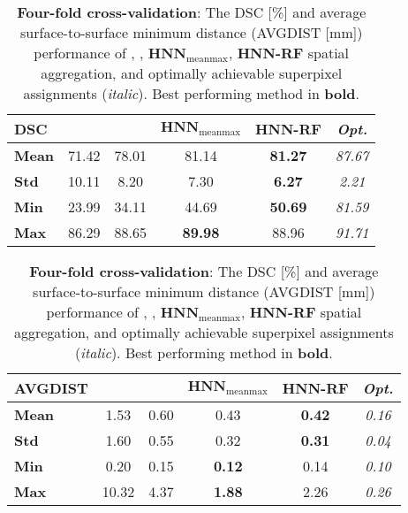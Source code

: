 \documentclass[journal]{IEEEtran}
\begin{document}
\begin{table}[htb]
\centering
 \caption{\small \textbf{Four-fold cross-validation}: The DSC [\%] and average surface-to-surface minimum distance (AVGDIST [mm]) performance of \cite{roth2015deeporgan}, \cite{roth2016spatial}, $\mathbf{HNN}_\mathrm{meanmax}$, \textbf{HNN-RF} spatial aggregation, and optimally achievable superpixel assignments (\textit{italic}). Best performing method in \textbf{bold}.} 
 \begin{subtable}[center]{0.95\columnwidth}
  \raggedright
    \begin{tabular}{l|c|c|c|c|c}
    \toprule
		\toprule
    \textbf{DSC} & \cite{roth2015deeporgan}  & \cite{roth2016spatial}& $\mathbf{HNN}_\mathrm{meanmax}$ & \textbf{HNN-RF} & \textit{\textbf{Opt.}} \\
		\midrule    
\textbf{Mean}	&71.42 & 78.01& 81.14                 &\textbf{81.27}  	& \textit{87.67}   \\
\textbf{Std}      &10.11 & 8.20  	      & 7.30                   &\textbf{6.27} & \textit{ 2.21}  \\
\textbf{Min}	&23.99 & 34.11 	   &	44.69                  &\textbf{50.69} & \textit{81.59}\\
\textbf{Max}	&86.29 & 88.65  	   &	\textbf{89.98} &88.96 & \textit{ 91.71} \\
    \bottomrule
		\bottomrule
    \end{tabular}%
 \end{subtable}%
\vskip 8pt  
 \begin{subtable}[center]{0.95\columnwidth}
 \raggedright
    \begin{tabular}{l|c|c|c|c|c}
    \toprule
		\toprule
    \textbf{AVGDIST} & \cite{roth2015deeporgan} & \cite{roth2016spatial} & $\mathbf{HNN}_\mathrm{meanmax}$ & \textbf{HNN-RF} & \textit{\textbf{Opt.}}\\
		\midrule    
\textbf{Mean}	&1.53	&0.60    	&0.43 &\textbf{0.42}&\textit{0.16}\\
\textbf{Std}      &1.60	&0.55		&0.32 &\textbf{0.31}&\textit{0.04}\\
\textbf{Min}	&0.20	&0.15	&\textbf{0.12} &0.14&\textit{0.10}	\\
\textbf{Max}	&10.32	&4.37		&\textbf{1.88} &2.26&\textit{0.26}\\
    \bottomrule
		\bottomrule
    \end{tabular}%
 \end{subtable}
\label{tab:results}%
\end{table}%
\end{document}
